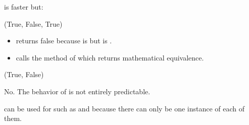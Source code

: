 \documentclass[letterpaper,10pt,english]{sphinxmanual}
\begin{document}

 is faster but:

\begin{sphinxVerbatim}[commandchars=\\\{\}]
        
\end{sphinxVerbatim}

\begin{sphinxVerbatim}[commandchars=\\\{\}]
(True, False, True)
\end{sphinxVerbatim}
\begin{itemize}
\item {} 
 returns false because  is  but  is .

\item {} 
\sphinxcode{\sphinxupquote{==}} calls the method  of  which returns mathematical equivalence.

\end{itemize}


\begin{sphinxVerbatim}[commandchars=\\\{\}]
    
     
\end{sphinxVerbatim}

\begin{sphinxVerbatim}[commandchars=\\\{\}]
(True, False)
\end{sphinxVerbatim}

No. The behavior of  is not entirely predictable.


 can be used for  such as  and  because there can only be one instance of each of them.
\end{document}
